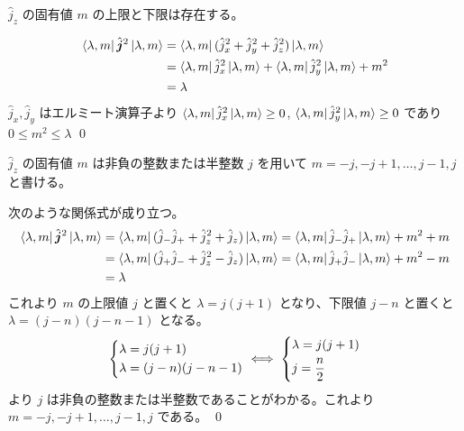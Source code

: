 \documentclass[uplatex,dvipdfmx,a4paper,11pt]{jlreq}
\makeatletter
\theoremstyle{definition}
\renewenvironment{proof}[1][\proofname]{\par
  \normalfont
  \topsep6\p@\@plus6\p@ \trivlist
  \item[\hskip\labelsep{\bfseries #1}\@addpunct{\bfseries}]\ignorespaces\quad\par
}{%
  \qed\endtrivlist\@endpefalse
}
\renewcommand\proofname{証明}
\makeatother
\begin{document}
\begin{proposition}
  $\hat{j}_z$ の固有値 $m$ の上限と下限は存在する。
\end{proposition}
\begin{proof}
  \begin{align}
    \bra{\lambda, m}\hat{\bm{j}}^2\ket{\lambda, m} & = \bra{\lambda, m}(\hat{j}_x^2 + \hat{j}_y^2 + \hat{j}_z^2)\ket{\lambda, m}                       \\
                                                   & = \bra{\lambda, m}\hat{j}_x^2\ket{\lambda, m} + \bra{\lambda, m}\hat{j}_y^2\ket{\lambda, m} + m^2 \\
                                                   & = \lambda
  \end{align}
  $\hat{j}_x, \hat{j}_y$ はエルミート演算子より $\bra{\lambda, m}\hat{j}_x^2\ket{\lambda, m} \geq 0$, $\bra{\lambda, m}\hat{j}_y^2\ket{\lambda, m} \geq 0$ であり $0 \leq m^2 \leq \lambda$
\end{proof}

\begin{proposition}
  $\hat{j}_z$ の固有値 $m$ は非負の整数または半整数 $j$ を用いて $m = -j,-j+1,\ldots,j-1,j$ と書ける。
\end{proposition}
\begin{proof}
  次のような関係式が成り立つ。
  \begin{align}
    \bra{\lambda, m}\hat{\bm{j}}^2\ket{\lambda, m} & = \bra{\lambda, m}(\hat{j}_-\hat{j}_+ + \hat{j}_z^2 + \hat{j}_z)\ket{\lambda, m} = \bra{\lambda, m}\hat{j}_-\hat{j}_+\ket{\lambda, m} + m^2 + m \\
                                                   & = \bra{\lambda, m}(\hat{j}_+\hat{j}_- + \hat{j}_z^2 - \hat{j}_z)\ket{\lambda, m} = \bra{\lambda, m}\hat{j}_+\hat{j}_-\ket{\lambda, m} + m^2 - m \\
                                                   & = \lambda
  \end{align}
  これより $m$ の上限値 $j$ と置くと $\lambda = j(j + 1)$ となり、下限値 $j - n$ と置くと $\lambda = (j - n)(j - n - 1)$ となる。
  \begin{align}
    \begin{dcases}
      \lambda = j(j + 1) \\
      \lambda = (j - n)(j - n - 1)
    \end{dcases}
    \iff
    \begin{dcases}
      \lambda = j(j + 1) \\
      j = \frac{n}{2}
    \end{dcases}
  \end{align}
  より $j$ は非負の整数または半整数であることがわかる。これより $m = -j, -j + 1,\ldots, j-1, j$ である。
\end{proof}
\end{document}
